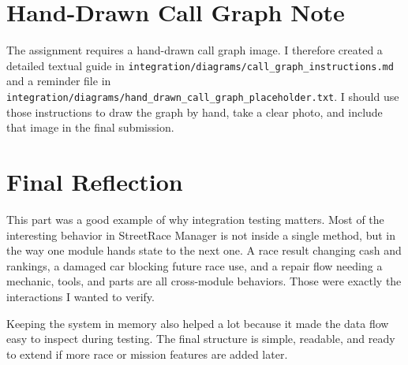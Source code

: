 \documentclass[12pt]{article}
\begin{document}
\section{Hand-Drawn Call Graph Note}
The assignment requires a hand-drawn call graph image. I therefore created a detailed textual guide in \texttt{integration/diagrams/call\_graph\_instructions.md} and a reminder file in \texttt{integration/diagrams/hand\_drawn\_call\_graph\_placeholder.txt}. I should use those instructions to draw the graph by hand, take a clear photo, and include that image in the final submission.

\section{Final Reflection}
This part was a good example of why integration testing matters. Most of the interesting behavior in StreetRace Manager is not inside a single method, but in the way one module hands state to the next one. A race result changing cash and rankings, a damaged car blocking future race use, and a repair flow needing a mechanic, tools, and parts are all cross-module behaviors. Those were exactly the interactions I wanted to verify.

Keeping the system in memory also helped a lot because it made the data flow easy to inspect during testing. The final structure is simple, readable, and ready to extend if more race or mission features are added later.
\end{document}
